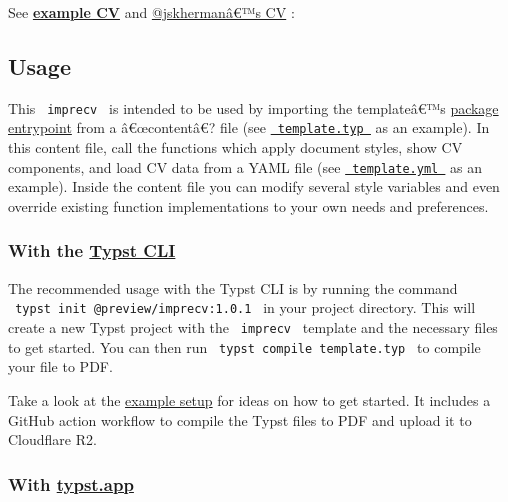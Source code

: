 See
\href{https://github.com/jskherman/imprecv/releases/latest/download/example.pdf}{\textbf{example
CV}} and \href{https://go.jskherman.com/cv}{@jskhermanâ€™s CV} :


\subsection{Usage}\label{usage}

This \texttt{\ imprecv\ } is intended to be used by importing the
templateâ€™s
\href{https://github.com/typst/packages/raw/main/packages/preview/imprecv/1.0.1/cv.typ}{package
entrypoint} from a â€œcontentâ€? file (see
\href{https://github.com/typst/packages/raw/main/packages/preview/imprecv/1.0.1/template/template.typ}{\texttt{\ template.typ\ }}
as an example). In this content file, call the functions which apply
document styles, show CV components, and load CV data from a YAML file
(see
\href{https://github.com/typst/packages/raw/main/packages/preview/imprecv/1.0.1/template/template.yml}{\texttt{\ template.yml\ }}
as an example). Inside the content file you can modify several style
variables and even override existing function implementations to your
own needs and preferences.

\subsubsection{\texorpdfstring{With the
\href{https://github.com/typst/typst}{Typst
CLI}}{With the Typst CLI}}\label{with-the-typst-cli}

The recommended usage with the Typst CLI is by running the command
\texttt{\ typst\ init\ @preview/imprecv:1.0.1\ } in your project
directory. This will create a new Typst project with the
\texttt{\ imprecv\ } template and the necessary files to get started.
You can then run \texttt{\ typst\ compile\ template.typ\ } to compile
your file to PDF.

Take a look at the
\href{https://github.com/jskherman/cv.typ-example-repo}{example setup}
for ideas on how to get started. It includes a GitHub action workflow to
compile the Typst files to PDF and upload it to Cloudflare R2.

\subsubsection{\texorpdfstring{With
\href{https://typst.app/}{typst.app}}{With typst.app}}\label{with-typst.app}

